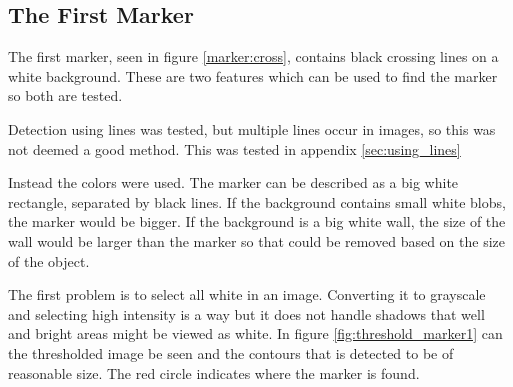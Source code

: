 \subsection{The First Marker}\label{sec:full_marker1}
The first marker, seen in figure \ref{marker:cross}, contains black crossing lines on a white background.
These are two features which can be used to find the marker so both are tested.

Detection using lines was tested, but multiple lines occur in images, so this was not deemed a good method.
This was tested in appendix \ref{sec:using_lines}

Instead the colors were used.
The marker can be described as a big white rectangle, separated by black lines.
If the background contains small white blobs, the marker would be bigger.
If the background is a big white wall, the size of the wall would be larger than the marker so that could be removed based on the size of the object.

The first problem is to select all white in an image.
Converting it to grayscale and selecting high intensity is a way but it does not handle shadows that well and bright areas might be viewed as white.
In figure \ref{fig:threshold_marker1} can the thresholded image be seen and the contours that is detected to be of reasonable size.
The red circle indicates where the marker is found.

